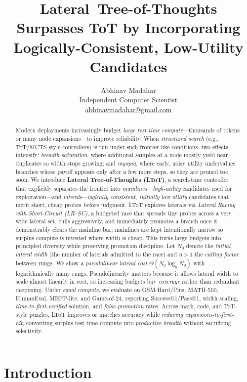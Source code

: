 \documentclass{article}
\title{Lateral~Tree\mbox{-}of\mbox{-}Thoughts Surpasses ToT by Incorporating Logically\mbox{-}Consistent, Low\mbox{-}Utility Candidates}
\author{Abhinav Madahar \\ Independent Computer Scientist \\ \href{mailto:abhinavmadahar@gmail.com}{abhinavmadahar@gmail.com}}
\begin{document}
\maketitle

\begin{abstract}
Modern deployments increasingly budget \emph{large test-time compute}---thousands of tokens or many node expansions---to improve reliability. When \emph{structured search} (e.g., ToT/MCTS-style controllers) is run under such frontier-like conditions, two effects intensify: \emph{breadth saturation}, where additional samples at a node mostly yield near-duplicates so width stops growing; and \emph{myopia}, where early, noisy utility undervalues branches whose payoff appears only after a few more steps, so they are pruned too soon. We introduce \textbf{Lateral Tree-of-Thoughts (LToT)}, a search-time controller that explicitly separates the frontier into \emph{mainlines}---\emph{high-utility} candidates used for exploitation---and \emph{laterals}---\emph{logically consistent, initially low-utility} candidates that merit short, cheap probes before judgment. LToT explores laterals via \emph{Lateral Racing with Short-Circuit (LR--SC)}, a budgeted race that spreads tiny probes across a very wide lateral set, culls aggressively, and immediately promotes a branch once it demonstrably clears the mainline bar; mainlines are kept intentionally narrow so surplus compute is invested where width is cheap. This turns large budgets into principled diversity while preserving promotion discipline. Let $N_{0}$ denote the \emph{initial lateral width} (the number of laterals admitted to the race) and $\eta>1$ the \emph{culling factor} between rungs. We show a \emph{pseudolinear lateral cost} $\Theta(N_{0}\log_{\eta}N_{0})$ with logarithmically many rungs. Pseudolinearity matters because it allows lateral width to scale almost linearly in cost, so increasing budgets buy \emph{coverage} rather than redundant deepening. Under \emph{equal compute}, we evaluate on GSM-Hard/Plus, MATH-500, HumanEval, MBPP-lite, and Game-of-24, reporting Success@1/Pass@1, width scaling, \emph{time-to-first-verified} solution, and \emph{false-promotion} rates. Across math, code, and ToT-style puzzles, LToT improves or matches accuracy while \emph{reducing expansions-to-first-hit}, converting surplus test-time compute into \emph{productive breadth} without sacrificing selectivity.
\end{abstract}

\section{Introduction}
\label{section:introduction}
\end{document}
